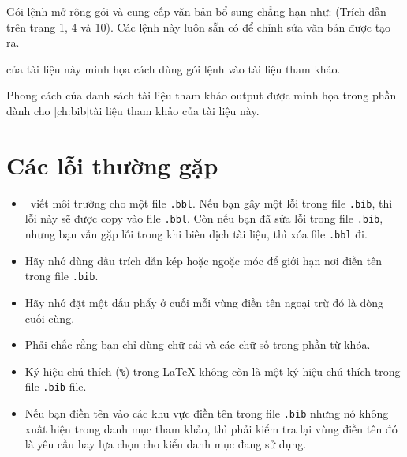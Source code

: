 \documentclass[a4paper]{report}
\begin{document}
\noindent Gói lệnh  mở rộng gói  và cung cấp văn bản bổ sung chẳng hạn như: (Trích dẫn trên trang 1, 4 và 10).  Các lệnh này luôn sẵn có để chỉnh sửa văn bản được tạo ra.
\begin{htmlonly}%
  của tài liệu này  minh họa cách dùng gói lệnh  vào tài liệu tham khảo.
\end{htmlonly}%
\begin{latexonly}%
Phong cách của danh sách tài liệu tham khảo output được minh họa trong phần dành cho \hyperref[hyper][ch:bib]{tài liệu tham khảo} của tài liệu này.
\end{latexonly}

\section{Các lỗi thường gặp}

\begin{itemize}
\item \BiBTeX\ viết môi trường   cho một file \texttt{.bbl}. Nếu bạn gây một lỗi \laTeX{} trong file \texttt{.bib}, thì lỗi này sẽ được copy vào file \texttt{.bbl}. Còn nếu bạn đã sửa lỗi trong file \texttt{.bib}, nhưng bạn vẫn gặp lỗi trong khi biên dịch tài liệu, thì xóa file \texttt{.bbl} đi.

\item Hãy nhớ dùng dấu trích dẫn kép hoặc ngoặc móc để giới hạn nơi điền tên trong file \texttt{.bib}.

\item Hãy nhớ đặt một dấu phẩy ở cuối mỗi vùng điền tên ngoại trừ đó là dòng cuối cùng.

\item Phải chắc rằng bạn chỉ dùng chữ cái và các chữ số trong phần từ khóa.

\item Ký hiệu chú thích (\verb|%|) trong \LaTeX{} không còn là một ký hiệu chú thích trong file \texttt{.bib} file.

\item Nếu bạn điền tên vào các khu vực điền tên trong file \texttt{.bib} nhưng nó không xuất hiện trong danh mục tham khảo, thì phải kiểm tra lại vùng điền tên đó là yêu cầu hay lựa chọn cho kiểu danh mục đang sử dụng. 

\end{itemize}

\end{document}
